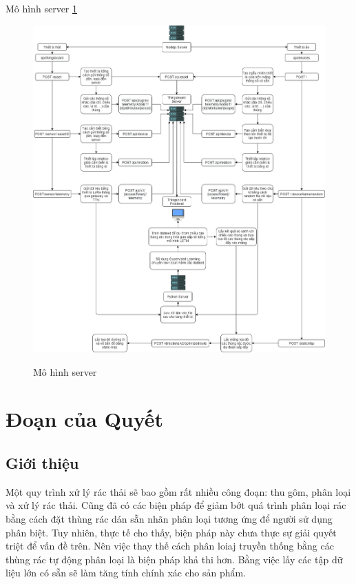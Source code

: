Mô hình server \ref{fig: chart_server}
\begin{figure}[h]
    \caption{Mô hình server }
    \includegraphics[width=\textwidth]{images/Chart_server.png}
    \label{fig: chart_server}
\end{figure}






\chapter{Đoạn của Quyết}
\section{Giới thiệu}
Một quy trình xử lý rác thải sẽ bao gồm rất nhiều công đoạn: thu gôm, phân loại và xử lý rác thải.
Cũng đã có các biện pháp để giảm bớt quá trình phân loại rác bằng cách đặt thùng rác dán sẵn nhãn phân loại tương ứng để người sử dụng phân biệt.
Tuy nhiên, thực tế cho thấy, biện pháp này chưa thực sự giải quyết triệt để vấn đề trên. 
Nên việc thay thế cách phân loiaj truyền thống bằng các thùng rác tự động phân loại là biện pháp khả thi hơn.
Bằng việc lấy các tập dữ liệu lớn có sẵn sẽ làm tăng tính chính xác cho sản phẩm. 

